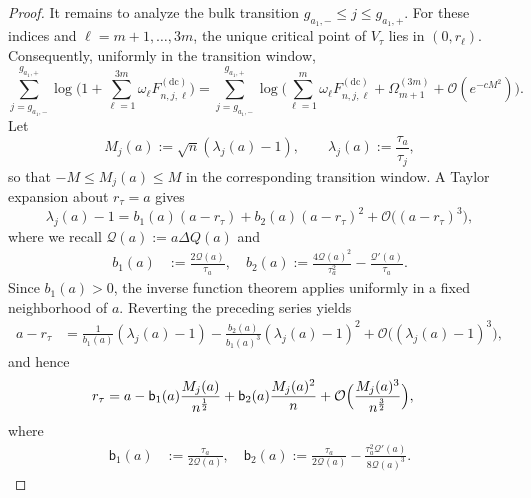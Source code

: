 \documentclass[a4paper]{article}
\numberwithin{equation}{section}
\begin{document}
\begin{proof}
It remains to analyze the bulk transition
$g_{a_1,-}\leq j\leq g_{a_1,+}$.  For these indices and
$\ell=m+1,\ldots,3m$, the unique critical point of $V_\tau$ lies in
$(0,r_\ell)$.  Consequently, uniformly in the transition window,
\begin{equation}
\label{def of pre sum ga1- ga1+}
    \sum_{j=g_{a_1,-}}^{g_{a_1,+}}
        \log\Big( 
1+\sum_{\ell=1}^{3m}\omega_{\ell}F_{n,j,\ell}^{(\mathrm{dc})}
\Bigr)
=
    \sum_{j=g_{a_1,-}}^{g_{a_1,+}}
        \log\Big( 
\sum_{\ell=1}^{m}\omega_{\ell}F_{n,j,\ell}^{(\mathrm{dc})}
+\Omega_{m+1}^{(3m)}+\mathcal{O}(e^{-cM^2})
\Bigr).
\end{equation}
Let
\begin{equation}
\label{def of Mja}
M_{j}(a):=\sqrt{n}(\lambda_{j}(a)-1),\qquad \lambda_{j}(a):=\frac{\tau_{a}}{\tau_j},
\end{equation}
so that $-M\leq M_j(a)\leq M$ in the corresponding transition window.
A Taylor expansion about $r_\tau=a$ gives
\[
\lambda_{j}(a)-1=b_1(a)(a-r_{\tau})+b_2(a)(a-r_{\tau})^2
+\mathcal{O}\bigl((a-r_{\tau})^3 \bigr),
\]
where we recall $\mathcal{Q}(a):=a\Delta Q(a)$ and 
\begin{align*}
b_1(a)&:=\frac{2\mathcal{Q}(a)}{\tau_{a}},
\quad
b_2(a):=\frac{4\mathcal{Q}(a)^2}{\tau_{a}^2}-\frac{\mathcal{Q}'(a)}{\tau_{a}}.
\end{align*}
Since $b_1(a)>0$, the inverse function theorem applies uniformly in a fixed
neighborhood of $a$.  Reverting the preceding series yields
\begin{align*}
a-r_{\tau}
&=\frac{1}{b_1(a)}(\lambda_{j}(a)-1)
-\frac{b_2(a)}{b_1(a)^3}(\lambda_{j}(a)-1)^2
+\mathcal{O}\bigl((\lambda_{j}(a)-1)^3\bigr),
\end{align*}
and hence
\begin{align*}
r_{\tau}
&=
a
-\mathsf{b}_1(a)\frac{M_j(a)}{n^{\frac{1}{2}}}
+\mathsf{b}_2(a)
\frac{M_j(a)^2}{n}
+\mathcal{O}\Bigl(\frac{M_j(a)^3}{n^{\frac{3}{2}}}\Bigr),
\end{align*}
where 
\begin{align*}
\mathsf{b}_1(a)&:=\frac{\tau_a}{2\mathcal{Q}(a)}, 
\quad
\mathsf{b}_2(a):=\frac{\tau_a}{2\mathcal{Q}(a)}-\frac{\tau_a^2\mathcal{Q}'(a)}{8\mathcal{Q}(a)^3}.
\end{align*}





\end{proof}
\end{document}
